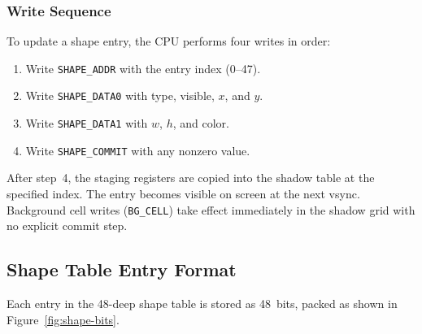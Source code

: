\documentclass[11pt,letterpaper]{article}
\begin{document}
\subsubsection{Write Sequence}

To update a shape entry, the CPU performs four writes in order:

\begin{enumerate}[nosep]
  \item Write \texttt{SHAPE\_ADDR} with the entry index (0--47).
  \item Write \texttt{SHAPE\_DATA0} with type, visible, $x$, and $y$.
  \item Write \texttt{SHAPE\_DATA1} with $w$, $h$, and color.
  \item Write \texttt{SHAPE\_COMMIT} with any nonzero value.
\end{enumerate}

After step~4, the staging registers are copied into the shadow table at
the specified index. The entry becomes visible on screen at the next
vsync. Background cell writes (\texttt{BG\_CELL}) take effect
immediately in the shadow grid with no explicit commit step.

\subsection{Shape Table Entry Format}
\label{sec:shape-entry}

Each entry in the 48-deep shape table is stored as 48~bits, packed as
shown in Figure~\ref{fig:shape-bits}.
\end{document}
